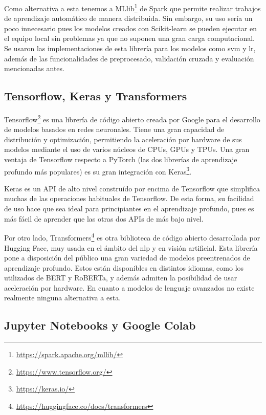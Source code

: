 Como alternativa a esta tenemos a MLlib\footnote{\url{https://spark.apache.org/mllib/}} de Spark que permite realizar trabajos de aprendizaje automático de manera distribuida. Sin embargo, su uso sería un poco innecesario pues los modelos creados con Scikit-learn se pueden ejecutar en el equipo local sin problemas ya que no suponen una gran carga computacional.
Se usaron las implementaciones de esta librería para los modelos como \gls{svm} y \gls{lr}, además de las funcionalidades de preprocesado, validación cruzada y  evaluación mencionadas antes.

\subsection{Tensorflow, Keras y Transformers}

Tensorflow\footnote{\url{https://www.tensorflow.org/}} es una librería de código abierto creada por Google para el desarrollo de modelos basados en redes neuronales. Tiene una gran capacidad de distribución y optimización, permitiendo la aceleración por hardware de sus modelos mediante el uso de varios núcleos de CPUs, GPUs y TPUs. Una gran ventaja de Tensorflow respecto a PyTorch (las dos librerías de aprendizaje profundo más populares) es su gran integración con Keras\footnote{\url{https://keras.io/}}.

Keras es un API de alto nivel construído por encima de Tensorflow que simplifica muchas de las operaciones habituales de Tensorflow. De esta forma, su facilidad de uso hace que sea ideal para principiantes en el aprendizaje profundo, pues es más fácil de aprender que las otras dos APIs de más bajo nivel.

Por otro lado, Transformers\footnote{\url{https://huggingface.co/docs/transformers}} es otra biblioteca de código abierto desarrollada por Hugging Face, muy usada en el ámbito del \acrshort{nlp} y en visión artificial. Esta librería pone a disposición del público una gran variedad de modelos preentrenados de aprendizaje profundo. Estos están disponibles en distintos idiomas, como los utilizados de BERT y RoBERTa, y además admiten la posibilidad de usar aceleración por hardware. En cuanto a modelos de lenguaje avanzados no existe realmente ninguna alternativa a esta.

\subsection{Jupyter Notebooks y Google Colab}


